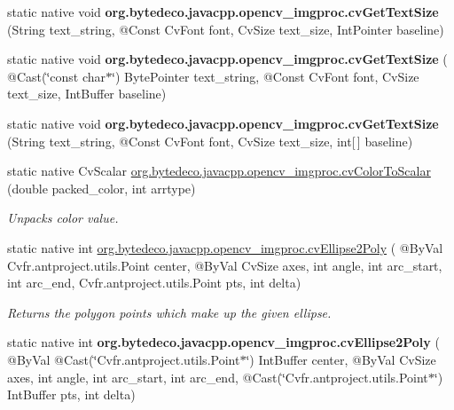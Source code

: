 \begin{DoxyCompactItemize}
\item 
\mbox{\label{group__imgproc__c_gab09654e77492b8b291e74c8ae2648357}} 
static native void {\bfseries org.\+bytedeco.\+javacpp.\+opencv\+\_\+imgproc.\+cv\+Get\+Text\+Size} (String text\+\_\+string, @Const Cv\+Font font, Cv\+Size text\+\_\+size, Int\+Pointer baseline)
\item 
\mbox{\label{group__imgproc__c_gaadc26b063f8f5bfdb6f4e79ca36acada}} 
static native void {\bfseries org.\+bytedeco.\+javacpp.\+opencv\+\_\+imgproc.\+cv\+Get\+Text\+Size} ( @Cast(\char`\"{}const char$\ast$\char`\"{}) Byte\+Pointer text\+\_\+string, @Const Cv\+Font font, Cv\+Size text\+\_\+size, Int\+Buffer baseline)
\item 
\mbox{\label{group__imgproc__c_ga724f3548216b44a666cb9f11daa23bfe}} 
static native void {\bfseries org.\+bytedeco.\+javacpp.\+opencv\+\_\+imgproc.\+cv\+Get\+Text\+Size} (String text\+\_\+string, @Const Cv\+Font font, Cv\+Size text\+\_\+size, int\mbox{[}$\,$\mbox{]} baseline)
\item 
static native Cv\+Scalar \hyperlink{group__imgproc__c_ga740bdb87be7fa22bb0fda2e620a13777}{org.\+bytedeco.\+javacpp.\+opencv\+\_\+imgproc.\+cv\+Color\+To\+Scalar} (double packed\+\_\+color, int arrtype)
\begin{DoxyCompactList}\small\item\em Unpacks color value. \end{DoxyCompactList}\item 
static native int \hyperlink{group__imgproc__c_ga4636892155a3d693c0906197d7777d0c}{org.\+bytedeco.\+javacpp.\+opencv\+\_\+imgproc.\+cv\+Ellipse2\+Poly} ( @By\+Val Cv\+fr.antproject.utils.Point center, @By\+Val Cv\+Size axes, int angle, int arc\+\_\+start, int arc\+\_\+end, Cv\+fr.antproject.utils.Point pts, int delta)
\begin{DoxyCompactList}\small\item\em Returns the polygon points which make up the given ellipse. \end{DoxyCompactList}\item 
\mbox{\label{group__imgproc__c_ga6d77dd413c0c082e8d61980fd40a306c}} 
static native int {\bfseries org.\+bytedeco.\+javacpp.\+opencv\+\_\+imgproc.\+cv\+Ellipse2\+Poly} ( @By\+Val @Cast(\char`\"{}Cv\+fr.antproject.utils.Point$\ast$\char`\"{}) Int\+Buffer center, @By\+Val Cv\+Size axes, int angle, int arc\+\_\+start, int arc\+\_\+end, @Cast(\char`\"{}Cv\+fr.antproject.utils.Point$\ast$\char`\"{}) Int\+Buffer pts, int delta)

\end{DoxyCompactItemize}
